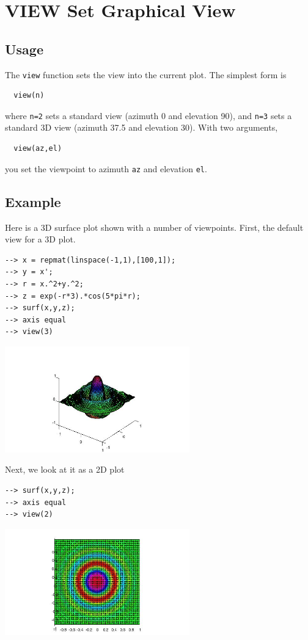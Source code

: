 \section{VIEW Set Graphical View}

\subsection{Usage}

The \verb|view| function sets the view into the current plot.
The simplest form is
\begin{verbatim}
  view(n)
\end{verbatim}
where \verb|n=2| sets a standard view (azimuth 0 and elevation 90),
and \verb|n=3| sets a standard 3D view (azimuth 37.5 and elevation 30).
With two arguments,
\begin{verbatim}
  view(az,el)
\end{verbatim}
you set the viewpoint to azimuth \verb|az| and elevation \verb|el|.
\subsection{Example}

Here is a 3D surface plot shown with a number of viewpoints.
First, the default view for a 3D plot.
\begin{verbatim}
--> x = repmat(linspace(-1,1),[100,1]);
--> y = x';
--> r = x.^2+y.^2;
--> z = exp(-r*3).*cos(5*pi*r);
--> surf(x,y,z);
--> axis equal
--> view(3)
\end{verbatim}


\centerline{\includegraphics[width=8cm]{view1}}

Next, we look at it as a 2D plot
\begin{verbatim}
--> surf(x,y,z);
--> axis equal
--> view(2)
\end{verbatim}


\centerline{\includegraphics[width=8cm]{view2}}

